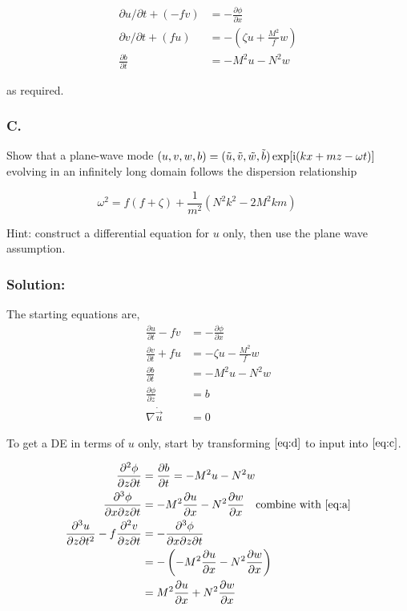 \documentclass[12 pt]{article}
\numberwithin{equation}{section} %
\begin{document}
\begin{align}
  \partial u/\partial t + (-fv) &= -\frac{\partial \phi}{\partial x}  \label{eq:u-instable} \\
  \partial v/\partial t + (fu) &= - \left( \zeta u + \frac{M^2}{f} w \right)  \label{eq:v-instable} \\
  \frac{\partial b}{\partial t} &= -M^2 u - N^2 w  \label{eq:b-instable}
\end{align}

as required. \\

\subsubsection*{C.} Show that a plane-wave mode $(u, v, w, b) = (\tilde u, \tilde v, \tilde w, \tilde b)\exp[\text i(kx + mz - \omega t)]$ evolving in an infinitely long domain follows the dispersion relationship

\begin{equation}
  \omega^2 = f(f + \zeta) + \frac{1}{m^2}\left (N^2k^2 - 2M^2km\right ) \qquad
\end{equation}

Hint: construct a differential equation for $u$ only, then use the plane wave assumption. \\

\subsubsection*{Solution:}
The starting equations are,
\begin{align}
  \frac{\partial u}{\partial t} - fv &= -\frac{\partial \phi}{\partial x} \label{eq:a} \\
  \frac{\partial v}{\partial t} + fu &= -\zeta u - \frac{M^2}{f}w \label{eq:b} \\
  \frac{\partial b}{\partial t} &= -M^2 u - N^2 w \label{eq:c} \\
  \frac{\partial \phi}{\partial z} &= b \label{eq:d} \\
  \nabla \dot \vec{u} &= 0 \label{eq:e}
\end{align}

To get a DE in terms of $u$ only, start by transforming $\ref{eq:d}$ to input into $\ref{eq:c}$.

\begin{align}
  \frac{\partial^2 \phi}{\partial z \partial t} &= \frac{\partial b}{\partial t} = -M^2 u - N^2 w  \nonumber\\
  \frac{\partial^3 \phi}{\partial x \partial z \partial t} &= -M^2 \frac{\partial u}{\partial x} - N^2 \frac{\partial w}{\partial x} \quad \text{combine with \ref{eq:a}}  \nonumber\\
  \frac{\partial^3 u}{\partial z \partial t^2} - f\frac{\partial^2 v}{\partial z \partial t} &= -\frac{\partial^3 \phi}{\partial x \partial z \partial t}  \nonumber\\
  &= -\left(-M^2 \frac{\partial u}{\partial x} - N^2 \frac{\partial w}{\partial x} \right)  \nonumber \\
  &= M^2 \frac{\partial u}{\partial x} + N^2 \frac{\partial w}{\partial x}  \label{eq:star1}
\end{align}
\end{document}
